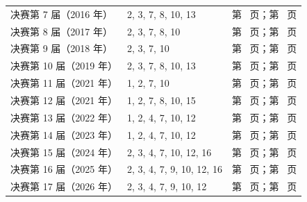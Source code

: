 \documentclass[UTF8,12pt,a4paper,fontset=fandol]{ctexart}
\begin{document}
\begin{longtable}{p{}p{}p{}}
决赛第 7 届（2016 年） & 2, 3, 7, 8, 10, 13 & 第~\pageref{ex:fin07-hi:2} 页；第~\pageref{ans:fin07-hi:2} 页\\

决赛第 8 届（2017 年） & 2, 3, 7, 8, 10 & 第~\pageref{ex:fin08-hi:2} 页；第~\pageref{ans:fin08-hi:2} 页\\

决赛第 9 届（2018 年） & 2, 3, 7, 10 & 第~\pageref{ex:fin09-hi:2} 页；第~\pageref{ans:fin09-hi:2} 页\\

决赛第 10 届（2019 年） & 2, 3, 7, 8, 10, 13 & 第~\pageref{ex:fin10-hi:2} 页；第~\pageref{ans:fin10-hi:2} 页\\

决赛第 11 届（2021 年） & 1, 2, 7, 10 & 第~\pageref{ex:fin11-high:1} 页；第~\pageref{ans:fin11-high:1} 页\\

决赛第 12 届（2021 年） & 1, 2, 7, 8, 10, 15 & 第~\pageref{ex:fin12-high:1} 页；第~\pageref{ans:fin12-high:1} 页\\

决赛第 13 届（2022 年） & 1, 2, 4, 7, 10, 12 & 第~\pageref{ex:fin13-high:1} 页；第~\pageref{ans:fin13-high:1} 页\\

决赛第 14 届（2023 年） & 1, 2, 4, 7, 10, 12 & 第~\pageref{ex:fin14-high:1} 页；第~\pageref{ans:fin14-high:1} 页\\

决赛第 15 届（2024 年） & 2, 3, 4, 7, 10, 12, 16 & 第~\pageref{ex:fin15-high:2} 页；第~\pageref{ans:fin15-high:2} 页\\

决赛第 16 届（2025 年） & 2, 3, 4, 7, 9, 10, 12, 16 & 第~\pageref{ex:fin16-high:2} 页；第~\pageref{ans:fin16-high:2} 页\\

决赛第 17 届（2026 年） & 2, 3, 4, 7, 9, 10, 12 & 第~\pageref{ex:fin17-high:2} 页；第~\pageref{ans:fin17-high:2} 页\\

\bottomrule\end{longtable}
\end{document}
